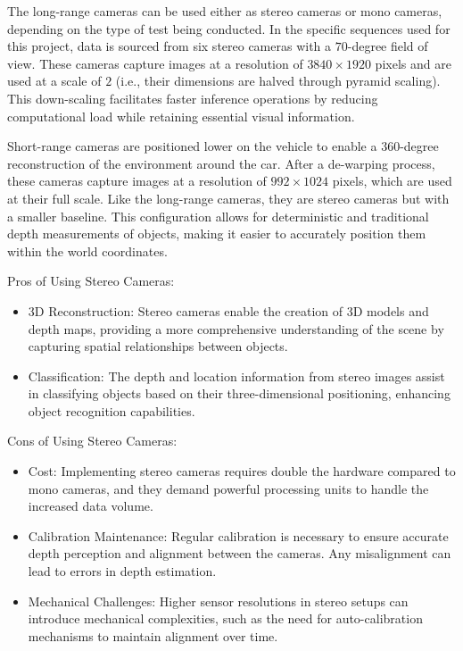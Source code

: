 The long-range cameras can be used either as stereo cameras or mono cameras, depending on the type of test being conducted. In the specific sequences used for this project, data is sourced from six stereo cameras with a $70$-degree field of view. These cameras capture images at a resolution of $3840 \times 1920$ pixels and are used at a scale of $2$ (i.e., their dimensions are halved through pyramid scaling). This down-scaling facilitates faster inference operations by reducing computational load while retaining essential visual information.

Short-range cameras are positioned lower on the vehicle to enable a $360$-degree reconstruction of the environment around the car. After a de-warping process, these cameras capture images at a resolution of $992 \times 1024$ pixels, which are used at their full scale. Like the long-range cameras, they are stereo cameras but with a smaller baseline. This configuration allows for deterministic and traditional depth measurements of objects, making it easier to accurately position them within the world coordinates.

Pros of Using Stereo Cameras:
\begin{itemize}
    \item 3D Reconstruction: Stereo cameras enable the creation of 3D models and depth maps, providing a more comprehensive understanding of the scene by capturing spatial relationships between objects.
    \item Classification: The depth and location information from stereo images assist in classifying objects based on their three-dimensional positioning, enhancing object recognition capabilities.
\end{itemize}

Cons of Using Stereo Cameras:
\begin{itemize}
    \item Cost: Implementing stereo cameras requires double the hardware compared to mono cameras, and they demand powerful processing units to handle the increased data volume.
    \item Calibration Maintenance: Regular calibration is necessary to ensure accurate depth perception and alignment between the cameras. Any misalignment can lead to errors in depth estimation.
    \item Mechanical Challenges: Higher sensor resolutions in stereo setups can introduce mechanical complexities, such as the need for auto-calibration mechanisms to maintain alignment over time.
\end{itemize}


